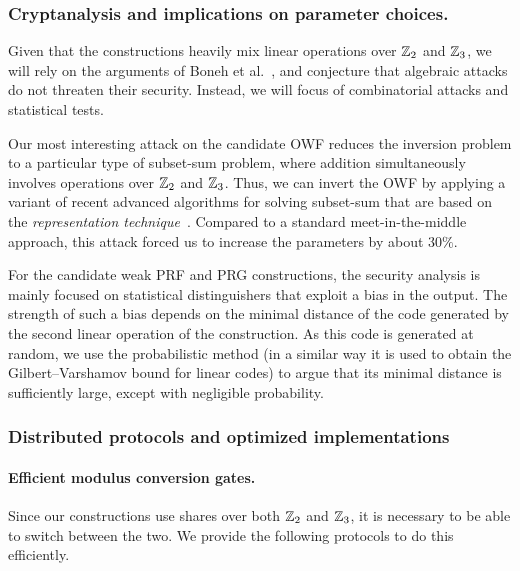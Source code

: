 \subsubsection{Cryptanalysis and implications on parameter choices.}
Given that the constructions heavily mix linear operations over $\mathbb{Z}_2$ and $\mathbb{Z}_3$, 
we will rely on the arguments of Boneh et al.~\cite{boneh2018-darkmatter}, 
and conjecture that algebraic attacks do not threaten their security.
Instead, we will focus of combinatorial attacks and statistical tests.

Our most interesting attack on the 
candidate OWF reduces the inversion problem to a particular type of subset-sum problem,
where addition simultaneously involves operations over $\mathbb{Z}_2$ and $\mathbb{Z}_3$.
Thus, we can invert the OWF by applying a variant of recent advanced algorithms
for solving subset-sum that are based on the 
\emph{representation technique}~\cite{Howgrave-GrahamJ10,BeckerCJ11,BonnetainBSS20}.
Compared to a standard meet-in-the-middle approach, 
this attack forced us to increase the parameters by about $30\%$.

For the candidate weak PRF and PRG constructions, 
the security analysis is mainly focused on
statistical distinguishers that exploit a bias in the output.
The strength of such a bias depends on the minimal distance of the 
code generated by the second linear operation of the construction.
As this code is generated at random, we use the probabilistic method
(in a similar way it is used to obtain the Gilbert–Varshamov bound for linear codes) 
to argue that its minimal distance is sufficiently large, except with negligible probability. 


\subsubsection{Distributed protocols and optimized implementations}
 
\paragraph{Efficient modulus conversion gates.}
Since our constructions use shares over both $\mathbb{Z}_2$ and $\mathbb{Z}_3$, it is necessary to be able to switch between the two. We provide the following protocols to do this efficiently. 

